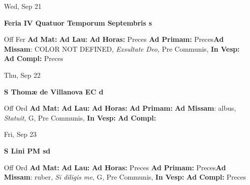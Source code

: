 \documentclass[10pt]{book}
\begin{document}
\begin{center}
\begin{minipage}{3.5in}
\vspace{2em}
\begin{center}Wed, Sep 21
\end{center}
\textbf{ \large Feria IV Quatuor Temporum Septembris
\textnormal{\normalsize s}}

\begin{justify}Off Fer
\textbf{Ad Mat: }
\textbf{Ad Lau: }
\textbf{Ad Horas: }Preces
\textbf{Ad Primam: }Preces\textbf{Ad Missam}: COLOR NOT DEFINED, \textit{Exsultate Deo,} Pre Communis, 
\textbf{In Vesp: }
\textbf{Ad Compl: }Preces
\end{justify}
\end{minipage}
\end{center}

\begin{center}
\begin{minipage}{3.5in}
\vspace{2em}
\begin{center}Thu, Sep 22
\end{center}
\textbf{ \large S Thomæ de Villanova EC
\textnormal{\normalsize d}}

\begin{justify}Off Ord
\textbf{Ad Mat: }
\textbf{Ad Lau: }
\textbf{Ad Horas: }
\textbf{Ad Primam: }\textbf{Ad Missam}: albus, \textit{Statuit,} G, Pre Communis, 
\textbf{In Vesp: }
\textbf{Ad Compl: }
\end{justify}
\end{minipage}
\end{center}

\begin{center}
\begin{minipage}{3.5in}
\vspace{2em}
\begin{center}Fri, Sep 23
\end{center}
\textbf{ \large S Lini PM
\textnormal{\normalsize sd}}

\begin{justify}Off Ord
\textbf{Ad Mat: }
\textbf{Ad Lau: }
\textbf{Ad Horas: }Preces
\textbf{Ad Primam: }Preces\textbf{Ad Missam}: ruber, \textit{Si diligis me,} G, Pre Communis, 
\textbf{In Vesp: }
\textbf{Ad Compl: }Preces
\end{justify}
\end{minipage}
\end{center}
\end{document}
